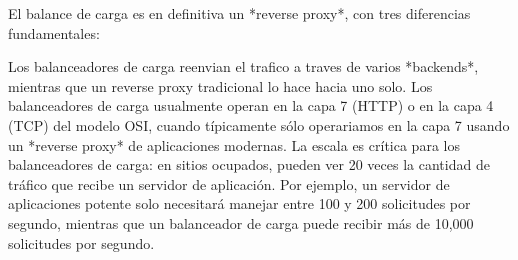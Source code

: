 El balance de carga es en definitiva un *reverse proxy*, con tres diferencias fundamentales: 
\begin{outline}
\1 Los balanceadores de carga reenvian el trafico a traves de varios *backends*, mientras que un reverse proxy tradicional lo hace hacia uno solo.
\1 Los balanceadores de carga usualmente operan en la capa 7 (HTTP) o en la capa 4 (TCP) del modelo OSI, cuando típicamente sólo operariamos en la capa 7 usando un *reverse proxy* de aplicaciones modernas.
\1 La escala es crítica para los balanceadores de carga: en sitios ocupados, pueden ver 20 veces la cantidad de tráfico que recibe un servidor de aplicación. Por ejemplo, un servidor de aplicaciones potente solo necesitará manejar entre 100 y 200 solicitudes por segundo, mientras que un balanceador de carga puede recibir más de 10,000 solicitudes por segundo.
\end{outline}